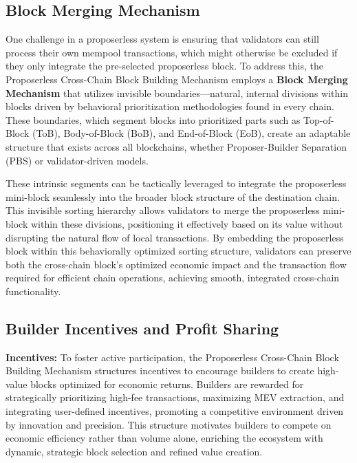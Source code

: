 \documentclass{article}
\begin{document}
\subsection*{Block Merging Mechanism}

One challenge in a proposerless system is ensuring that validators can still process their own mempool transactions, which might otherwise be excluded if they only integrate the pre-selected proposerless block. To address this, the Proposerless Cross-Chain Block Building Mechanism employs a \textbf{Block Merging Mechanism} that utilizes invisible boundaries—natural, internal divisions within blocks driven by behavioral prioritization methodologies found in every chain. These boundaries, which segment blocks into prioritized parts such as Top-of-Block (ToB), Body-of-Block (BoB), and End-of-Block (EoB), create an adaptable structure that exists across all blockchains, whether Proposer-Builder Separation (PBS) or validator-driven models.

These intrinsic segments can be tactically leveraged to integrate the proposerless mini-block seamlessly into the broader block structure of the destination chain. This invisible sorting hierarchy allows validators to merge the proposerless mini-block within these divisions, positioning it effectively based on its value without disrupting the natural flow of local transactions. By embedding the proposerless block within this behaviorally optimized sorting structure, validators can preserve both the cross-chain block’s optimized economic impact and the transaction flow required for efficient chain operations, achieving smooth, integrated cross-chain functionality.

\subsection*{Builder Incentives and Profit Sharing}

\textbf{Incentives:} To foster active participation, the Proposerless Cross-Chain Block Building Mechanism structures incentives to encourage builders to create high-value blocks optimized for economic returns. Builders are rewarded for strategically prioritizing high-fee transactions, maximizing MEV extraction, and integrating user-defined incentives, promoting a competitive environment driven by innovation and precision. This structure motivates builders to compete on economic efficiency rather than volume alone, enriching the ecosystem with dynamic, strategic block selection and refined value creation.
\end{document}
